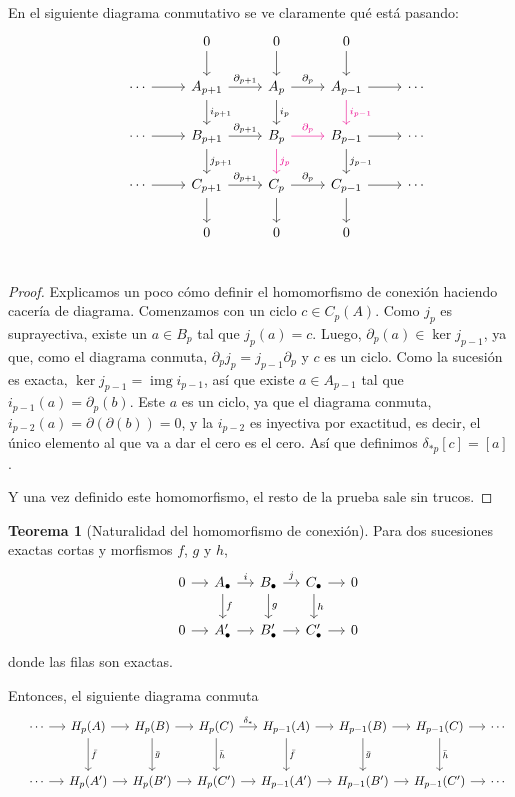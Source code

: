 \documentclass[spanish]{book}
\theoremstyle{definition}
\newtheorem*{teo}{Teorema}
\DeclareMathOperator{\img}{img}
\begin{document}
En el siguiente diagrama conmutativo se ve claramente qué está pasando:
\[
\begin{tikzcd}
	& & 0 \arrow{d} & 0 \arrow{d} & 0 \arrow{d} & \\
	& \cdots \arrow{r} & A_{p+1} \arrow{r}{\partial_{p+1}} \arrow{d}{i_{p+1}} & A_p \arrow{r}{\partial_p} \arrow{d}{i_p} & A_{p-1} \arrow{r} \arrow[d,magenta,"i_{p-1}"] & \cdots \\
	& \cdots \arrow{r} & B_{p+1} \arrow{r}{\partial_{p+1}} \arrow{d}{j_{p+1}} & B_p \arrow[r,magenta,"\partial_p"] \arrow[d,magenta,"j_p"] & B_{p-1} \arrow{r} \arrow{d}{j_{p-1}} & \cdots \\
	& \cdots \arrow{r} & C_{p+1} \arrow{r}{\partial_{p+1}} \arrow{d} & C_p \arrow{r}{\partial_p} \arrow{d} & C_{p-1} \arrow{r} \arrow{d} & \cdots \\
	& & 0 & 0 & 0 & \\
\end{tikzcd}
\]
\begin{proof}
	Explicamos un poco cómo definir el homomorfismo de conexión haciendo cacería de diagrama. Comenzamos con un ciclo $c\in C_p(A)$. Como $j_p$ es suprayectiva, existe un $a\in B_p$ tal que $j_p(a)=c$. Luego, $\partial_p(a)\in\ker j_{p-1}$, ya que, como el diagrama conmuta, $\partial_pj_p=j_{p-1}\partial_p$ y $c$ es un ciclo. Como la sucesión es exacta, $\ker j_{p-1}=\img i_{p-1}$, así que existe $a\in A_{p-1}$ tal que $i_{p-1}(a)=\partial_p(b)$. Este $a$ es un ciclo, ya que el diagrama conmuta, $i_{p-2}(a)=\partial(\partial(b))=0$, y la $i_{p-2}$ es inyectiva por exactitud, es decir, el único elemento al que va a dar el cero es el cero. Así que definimos $\delta_{*p}[c]=[a]$.
	
	Y una vez definido este homomorfismo, el resto de la prueba sale sin trucos.
\end{proof}
\begin{teo}[Naturalidad del homomorfismo de conexión]
	Para dos sucesiones exactas cortas y morfismos $f$, $g$ y $h$,
	\[\begin{tikzcd}[column sep=small]
		&0\arrow{r}&A_\bullet\arrow{r}{i}\arrow{d}{f}&B_\bullet\arrow{r}{j}\arrow{d}{g}&C_\bullet\arrow{r}\arrow{d}{h}&0\\
		&0\arrow{r}&A'_\bullet\arrow{r}&B'_\bullet\arrow{r}&C'_\bullet\arrow{r}&0
	\end{tikzcd}\]
	donde las filas son exactas.\par
	Entonces, el siguiente diagrama conmuta
	\[\begin{tikzcd}[column sep=small, row sep=large]
		& \cdots \arrow{r} & H_p(A) \arrow{r} \arrow{d}{\bar{f}} & H_p(B) \arrow{r} \arrow{d}{\bar{g}} & H_p(C) \arrow{r}{\delta_*} \arrow{d}{\bar{h}} & H_{p-1}(A) \arrow{r} \arrow{d}{\bar{f}} & H_{p-1}(B) \arrow{r} \arrow{d}{\bar{g}} & H_{p-1}(C) \arrow{r} \arrow{d}{\bar{h}} & \cdots \\
		& \cdots \arrow{r} & H_p(A') \arrow{r} & H_p(B') \arrow{r} & H_p(C') \arrow{r} & H_{p-1}(A') \arrow{r} & H_{p-1}(B') \arrow{r} & H_{p-1}(C') \arrow{r} & \cdots
	\end{tikzcd}\]
\end{teo}
\end{document}
